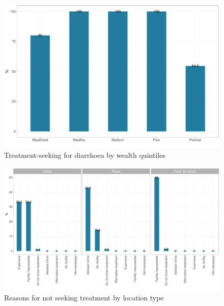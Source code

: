 \documentclass[12pt,a4paper]{article}
\begin{document}
\begin{figure}[H]

{\centering \includegraphics{kayinReport_files/figure-latex/diarrhoea2plot-1} 

}

\caption{Treatment-seeking for diarrhoea by wealth quintiles}\label{fig:diarrhoea2plot}
\end{figure}

\begin{figure}[H]

{\centering \includegraphics{kayinReport_files/figure-latex/diarrhoea4plot-1} 

}

\caption{Reasons for not seeking treatment by location type}\label{fig:diarrhoea4plot}
\end{figure}
\end{document}
